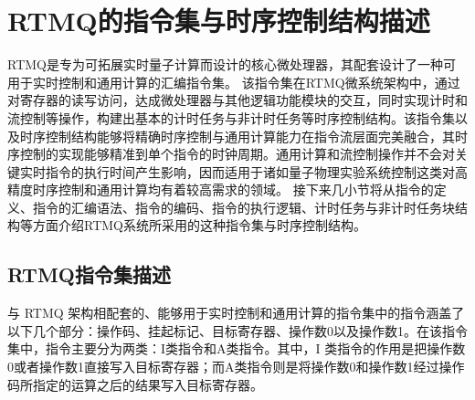 


\section[RTMQ的指令集与时序控制结构描述]{RTMQ的指令集与时序控制结构描述\label{section:rtmq_instructions}}
RTMQ是专为可拓展实时量子计算而设计的核心微处理器，其配套设计了一种可用于实时控制和通用计算的汇编指令集\cite[]{junhua03}。
该指令集在RTMQ微系统架构中，通过对寄存器的读写访问，达成微处理器与其他逻辑功能模块的交互，同时实现计时和流控制等操作，构建出基本的计时任务与非计时任务等时序控制结构。该指令集以及时序控制结构能够将精确时序控制与通用计算能力在指令流层面完美融合，其时序控制的实现能够精准到单个指令的时钟周期。通用计算和流控制操作并不会对关键实时指令的执行时间产生影响，因而适用于诸如量子物理实验系统控制这类对高精度时序控制和通用计算均有着较高需求的领域。
接下来几小节将从指令的定义、指令的汇编语法、指令的编码、指令的执行逻辑、计时任务与非计时任务块结构等方面介绍RTMQ系统所采用的这种指令集与时序控制结构。

\subsection[RTMQ指令集描述]{RTMQ指令集描述\label{section:rtmq_instruction_set}}

与 RTMQ 架构相配套的、能够用于实时控制和通用计算的指令集中的指令涵盖了以下几个部分：操作码、挂起标记、目标寄存器、操作数0以及操作数1。在该指令集中，指令主要分为两类：I类指令和A类指令。其中，I 类指令的作用是把操作数0或者操作数1直接写入目标寄存器；而A类指令则是将操作数0和操作数1经过操作码所指定的运算之后的结果写入目标寄存器。


